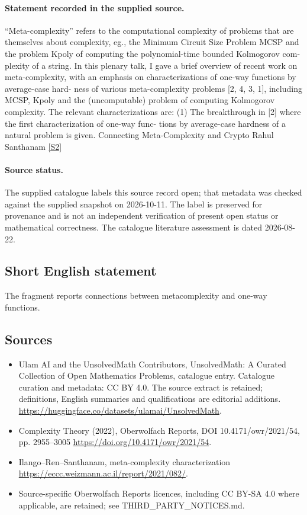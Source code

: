\documentclass[11pt]{article}
\newcommand{\sref}[2]{\hyperlink{source:#1:#2}{[S#2]}}
\begin{document}
\paragraph{Statement recorded in the supplied source.}
“Meta-complexity” refers to the computational complexity of problems that are themselves about complexity, eg., the Minimum Circuit Size Problem MCSP and the problem Kpoly of computing the polynomial-time bounded Kolmogorov com- plexity of a string. In this plenary talk, I gave a brief overview of recent work on meta-complexity, with an emphasis on characterizations of one-way functions by average-case hard- ness of various meta-complexity problems [2, 4, 3, 1], including MCSP, Kpoly and the (uncomputable) problem of computing Kolmogorov complexity. The relevant characterizations are: (1) The breakthrough in [2] where the first characterization of one-way func- tions by average-case hardness of a natural problem is given. Connecting Meta-Complexity and Crypto Rahul Santhanam \sref{statement}{2}
\paragraph{Source status.}
The supplied catalogue labels this source record open; that metadata was checked against the supplied snapshot on 2026-10-11. The label is preserved for provenance and is not an independent verification of present open status or mathematical correctness. The catalogue literature assessment is dated 2026-08-22.
\subsection{Short English statement}
The fragment reports connections between metacomplexity and one-way functions.
\subsection{Sources}
\begin{itemize}
\item[\hypertarget{source:statement:1}{S1}] Ulam AI and the UnsolvedMath Contributors, UnsolvedMath: A Curated Collection of Open Mathematics Problems, catalogue entry. Catalogue curation and metadata: CC BY 4.0. The source extract is retained; definitions, English summaries and qualifications are editorial additions.
\url{https://huggingface.co/datasets/ulamai/UnsolvedMath}.
\item[\hypertarget{source:statement:2}{S2}] Complexity Theory (2022), Oberwolfach Reports, DOI 10.4171/owr/2021/54, pp. 2955--3005
\url{https://doi.org/10.4171/owr/2021/54}.
\item[\hypertarget{source:statement:3}{S3}] Ilango--Ren--Santhanam, meta-complexity characterization
\url{https://eccc.weizmann.ac.il/report/2021/082/}.
\item Source-specific Oberwolfach Reports licences, including CC BY-SA 4.0 where applicable, are retained; see THIRD\_PARTY\_NOTICES.md.
\end{itemize}
\end{document}
